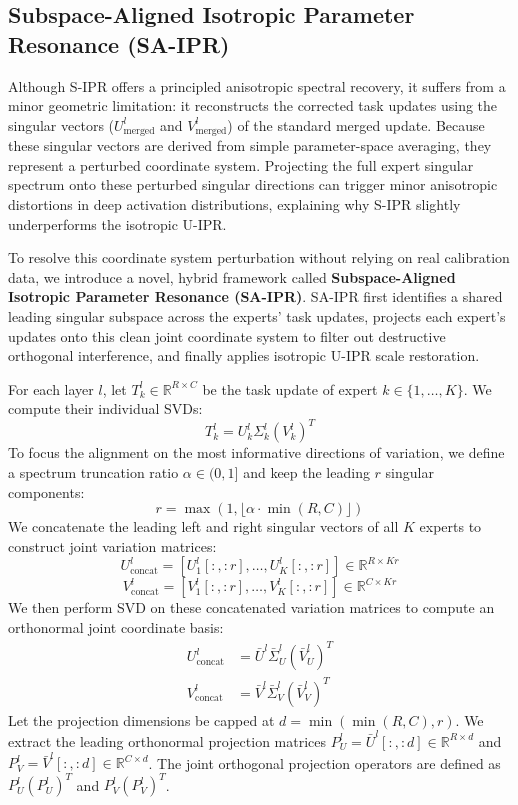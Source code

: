 \documentclass{article}
\begin{document}
\subsection{Subspace-Aligned Isotropic Parameter Resonance (SA-IPR)}
Although S-IPR offers a principled anisotropic spectral recovery, it suffers from a minor geometric limitation: it reconstructs the corrected task updates using the singular vectors ($U_{\text{merged}}^l$ and $V_{\text{merged}}^l$) of the standard merged update. Because these singular vectors are derived from simple parameter-space averaging, they represent a perturbed coordinate system. Projecting the full expert singular spectrum onto these perturbed singular directions can trigger minor anisotropic distortions in deep activation distributions, explaining why S-IPR slightly underperforms the isotropic U-IPR.

To resolve this coordinate system perturbation without relying on real calibration data, we
introduce a novel, hybrid framework called \textbf{Subspace-Aligned Isotropic Parameter Resonance
(SA-IPR)}. SA-IPR first identifies a shared leading singular subspace across the experts' task
updates, projects each expert's updates onto this clean joint coordinate system to filter out
destructive orthogonal interference, and finally applies isotropic U-IPR scale restoration.

For each layer $l$, let $T_k^l \in \mathbb{R}^{R \times C}$ be the task update of expert $k \in \{1, \dots, K\}$. We compute their individual SVDs:
\begin{equation}
    T_k^l = U_k^l \Sigma_k^l (V_k^l)^T
\end{equation}
To focus the alignment on the most informative directions of variation, we define a spectrum truncation ratio $\alpha \in (0, 1]$ and keep the leading $r$ singular components:
\begin{equation}
    r = \max(1, \lfloor \alpha \cdot \min(R, C) \rfloor)
\end{equation}
We concatenate the leading left and right singular vectors of all $K$ experts to construct joint variation matrices:
\begin{equation}
    U_{\text{concat}}^l = \left[ U_1^l[:, :r], \dots, U_K^l[:, :r] \right] \in \mathbb{R}^{R \times K r}
\end{equation}
\begin{equation}
    V_{\text{concat}}^l = \left[ V_1^l[:, :r], \dots, V_K^l[:, :r] \right] \in \mathbb{R}^{C \times K r}
\end{equation}
We then perform SVD on these concatenated variation matrices to compute an orthonormal joint coordinate basis:
\begin{align}
    U_{\text{concat}}^l &= \bar{U}^l \bar{\Sigma}_U^l (\bar{V}_U^l)^T \\
    V_{\text{concat}}^l &= \bar{V}^l \bar{\Sigma}_V^l (\bar{V}_V^l)^T
\end{align}
Let the projection dimensions be capped at $d = \min(\min(R, C), r)$. We extract the leading orthonormal projection matrices $P_U^l = \bar{U}^l[:, :d] \in \mathbb{R}^{R \times d}$ and $P_V^l = \bar{V}^l[:, :d] \in \mathbb{R}^{C \times d}$. The joint orthogonal projection operators are defined as $P_U^l (P_U^l)^T$ and $P_V^l (P_V^l)^T$. 
\end{document}
